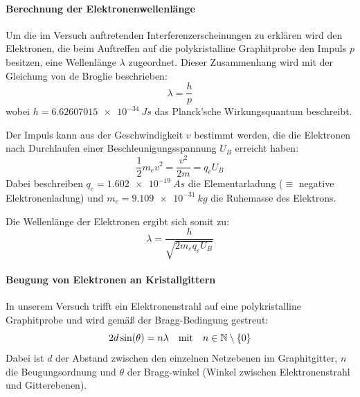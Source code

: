 \documentclass[ngerman]{scrartcl}
\begin{document}
\paragraph{Berechnung der Elektronenwellenlänge}
%
Um die im Versuch auftretenden Interferenzerscheinungen zu erklären wird den Elektronen, die beim Auftreffen auf die polykristalline Graphitprobe den Impuls $p$ besitzen, eine Wellenlänge $\lambda$ zugeordnet. Dieser Zusammenhang wird mit der Gleichung von de Broglie beschrieben:
%
\begin{equation}
    \label{eq:de_broglie}
    \lambda = \frac{h}{p}
\end{equation}
%
wobei $h=\SI{6.62607015e-34}{Js}$ das Planck'sche Wirkungsquantum beschreibt.

Der Impuls kann aus der Geschwindigkeit $v$ bestimmt werden, die die Elektronen nach Durchlaufen einer Beschleunigungsspannung $U_B$ erreicht haben:
%
\begin{equation}
    \label{eq:kinetische_energie}
    \frac{1}{2} m_e v^2 = \frac{v^2}{2 m} = q_e U_B
\end{equation}
%
Dabei beschreiben $q_e = \SI{1.602e-19}{As}$ die Elementarladung ($\equiv$ negative Elektronenladung) und $m_e = \SI{9.109e-31}{kg}$ die Ruhemasse des Elektrons.

Die Wellenlänge der Elektronen ergibt sich somit zu:
%
\begin{equation}
    \label{eq:wellenlaenge_elektronen}
    \lambda = \frac{h}{\sqrt{2 m_e q_e U_B}}
\end{equation}

\paragraph{Beugung von Elektronen an Kristallgittern}
%
In unserem Versuch trifft ein Elektronenstrahl auf eine polykristalline Graphitprobe und wird gemäß der Bragg-Bedingung gestreut:
%
\begin{equation}
    \label{eq:bragg}
    2 d \sin(\theta) = n \lambda \qq{mit} n \in \mathbb{N}\setminus\{0\}
\end{equation}
%
Dabei ist $d$ der Abstand zwischen den einzelnen Netzebenen im Graphitgitter, $n$ die Beugungsordnung und $\theta$ der Bragg-winkel (Winkel zwischen Elektronenstrahl und Gitterebenen).
\end{document}

